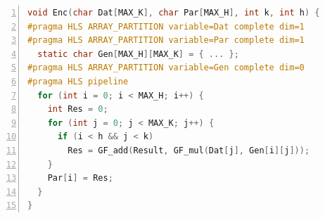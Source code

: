\begin{lstlisting}[language=C,basicstyle=\footnotesize,numbers=left,
                   captionpos=b,caption={Matrix-Vector Multiplier},
                   label=Multiplier]
void Enc(char Dat[MAX_K], char Par[MAX_H], int k, int h) {
#pragma HLS ARRAY_PARTITION variable=Dat complete dim=1
#pragma HLS ARRAY_PARTITION variable=Par complete dim=1
  static char Gen[MAX_H][MAX_K] = { ... };
#pragma HLS ARRAY_PARTITION variable=Gen complete dim=0
#pragma HLS pipeline
  for (int i = 0; i < MAX_H; i++) {
    int Res = 0;
    for (int j = 0; j < MAX_K; j++) {
      if (i < h && j < k)
        Res = GF_add(Result, GF_mul(Dat[j], Gen[i][j]));
    }
    Par[i] = Res;
  }
}
\end{lstlisting}

